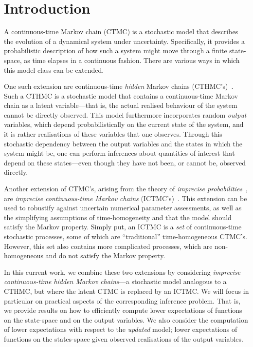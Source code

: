 \documentclass[3p]{elsarticle}
\begin{document}
\begin{frontmatter}
\end{frontmatter}

\section{Introduction}\label{sec:introduction}%
A continuous-time Markov chain (CTMC) is a stochastic model that describes the evolution of a dynamical system under uncertainty. Specifically, it provides a probabilistic description of how such a system might move through a finite state-space, as time elapses in a continuous fashion. There are various ways in which this model class can be extended.


One such extension are continuous-time \emph{hidden} Markov chains (CTHMC's)~\citep{wei2002continuous}. Such a CTHMC is a stochastic model that contains a continuous-time Markov chain as a latent variable---that is, the actual realised behaviour of the system cannot be directly observed. This model furthermore incorporates random \emph{output} variables, which depend probabilistically on the current state of the system, and it is rather realisations of these variables that one observes. Through this stochastic dependency between the output variables and the states in which the system might be, one can perform inferences about quantities of interest that depend on these states---even though they have not been, or cannot be, observed directly.

Another extension of CTMC's, arising from the theory of \emph{imprecise probabilities}~\citep{Walley:1991vk}, are \emph{imprecise continuous-time Markov chains} (ICTMC's)~\citep{Skulj:2015cq, krak2016ictmc}. This extension can be used to robustify against uncertain numerical parameter assessments, as well as the simplifying assumptions of time-homogeneity and that the model should satisfy the Markov property. 
Simply put, an ICTMC is a \emph{set} of continuous-time stochastic processes, some of which are ``traditional'' time-homogeneous CTMC's. However, this set also contains more complicated processes, which are non-homogeneous and do not satisfy the Markov property.



In this current work, we combine these two extensions by considering \emph{imprecise continuous-time hidden Markov chains}---a stochastic model analogous to a CTHMC, but where the latent CTMC is replaced by an ICTMC. We will focus in particular on practical aspects of the corresponding inference problem. That is, we provide results on how to efficiently compute lower expectations of functions on the state-space and on the output variables. We also consider the computation of lower expectations with respect to the \emph{updated} model; lower expectations of functions on the states-space given observed realisations of the output variables.
\end{document}

